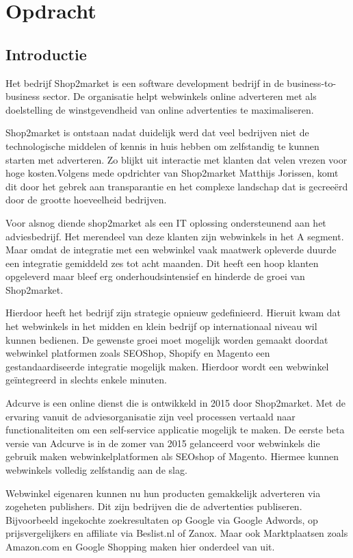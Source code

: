 \chapter{Opdracht}

\section{Introductie}

Het bedrijf Shop2market is een software development bedrijf in de business-to-business sector. De organisatie helpt webwinkels online adverteren met als doelstelling de winstgevendheid van online advertenties te maximaliseren.

Shop2market is ontstaan nadat duidelijk werd dat veel bedrijven niet de technologische middelen of kennis in huis hebben om zelfstandig te kunnen starten met adverteren. Zo blijkt uit interactie met klanten dat velen vrezen voor hoge kosten.Volgens mede opdrichter van Shop2market Matthijs Jorissen, komt dit door het gebrek aan transparantie en het complexe landschap dat is gecreeërd door de grootte hoeveelheid bedrijven.

Voor alsnog diende shop2market als een IT oplossing ondersteunend aan het adviesbedrijf. Het merendeel van deze klanten zijn webwinkels in het A segment. Maar omdat de integratie met een webwinkel vaak maatwerk opleverde duurde een integratie gemiddeld zes tot acht maanden. Dit heeft een hoop klanten opgeleverd maar bleef erg onderhoudsintensief en hinderde de groei van Shop2market.

Hierdoor heeft het bedrijf zijn strategie opnieuw gedefinieerd. Hieruit kwam dat het webwinkels in het midden en klein bedrijf op internationaal niveau wil kunnen bedienen. De gewenste groei moet mogelijk worden gemaakt doordat webwinkel platformen zoals SEOShop, Shopify en Magento een gestandaardiseerde integratie mogelijk maken. Hierdoor wordt een webwinkel geïntegreerd in slechts enkele minuten.

Adcurve is een online dienst die is ontwikkeld in 2015 door Shop2market. Met de ervaring vanuit de adviesorganisatie zijn veel processen vertaald naar functionaliteiten om een self-service applicatie mogelijk te maken. De eerste beta versie van Adcurve is in de zomer van 2015 gelanceerd voor webwinkels die gebruik maken webwinkelplatformen als SEOshop of Magento. Hiermee kunnen webwinkels volledig zelfstandig aan de slag.

Webwinkel eigenaren kunnen nu hun producten gemakkelijk adverteren via zogeheten publishers. Dit zijn bedrijven die de advertenties publiseren. Bijvoorbeeld ingekochte zoekresultaten op Google via Google Adwords, op prijsvergelijkers en affiliate via Beslist.nl of Zanox. Maar ook Marktplaatsen zoals Amazon.com en Google Shopping maken hier onderdeel van uit.

